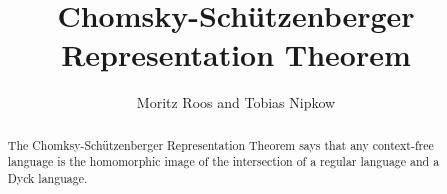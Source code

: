 \documentclass[11pt,a4paper]{article}
\begin{document}
\title{Chomsky-Sch\"utzenberger Representation Theorem}
\author{Moritz Roos and Tobias Nipkow}
\maketitle

\begin{abstract}
The Chomksy-Sch\"utzenberger Representation Theorem says that any
context-free language is the homomorphic image of the intersection of
a regular language and a Dyck language.
\end{abstract}

\tableofcontents





\end{document}

